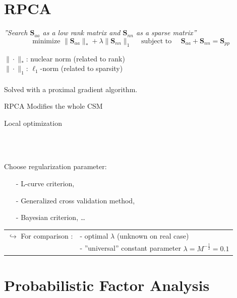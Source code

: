 \documentclass[9pt,xcolor=x11names,compress, notes=show]{beamer}%
\newcommand{\citeTransp}[1]{\color{fg!50} \citep{#1}}
\begin{document}
\section{RPCA}
\begin{frame}
\end{frame}
\begin{frame}{\insertsectionhead}

\textit{''Search $\bm{S}_{aa}$ as a low rank matrix and $\bm{S}_{nn}$ as a sparse matrix''}
	\begin{equation*}
		\boxed{
		\text{minimize~} \|\bm{{S}}_{aa} \|_* + \lambda \| \bm{{S}}_{nn} \|_1  \text{~~~~subject to~~~~}  \bm{{S}}_{aa} +  \bm{{S}}_{nn} = \bm{S}_{pp}
		}
	\end{equation*}
	
	$\| \cdot \|_*$: nuclear norm (related to rank)\\
	$\| \cdot \|_1$: $\ell_1$-norm (related to sparsity)\\~\\
	
	Solved with a proximal gradient algorithm.

	\begin{block}{RPCA  \citeTransp{Wright2009a}}
		 Modifies the whole CSM		\hfill\parbox{0.57\linewidth}{ Local optimization}\\[2pt]
		~\hfill\parbox{0.57\linewidth}{ Choose regularization parameter:
		\small
		\begin{itemize}
			\setlength{\itemindent}{0.3cm}
		        \item[-] L-curve criterion,\\[-2pt]
		        \item[-] Generalized cross validation method,\\[-2pt]
		       \item[-] Bayesian criterion, \dots
		\end{itemize}
		}
	\end{block}
	\vfill
	\begin{tabular}{rl}
	$\hookrightarrow$ For comparison :& - optimal $\lambda$  (unknown on real case)\\
	& - ''universal'' constant  parameter $\lambda=M^{-\frac{1}{2}}=0.1$
	\end{tabular}

\end{frame}

\section{Probabilistic Factor Analysis}
\begin{frame}
\end{frame}
\end{document}
